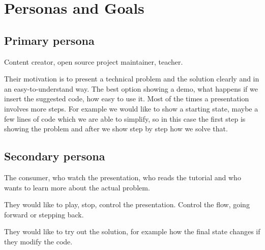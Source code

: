 \chapter{Personas and Goals}\label{C:personas}

\section{Primary persona}

Content creator, open source project maintainer, teacher.

Their motivation is to present a technical problem and the solution clearly and in an easy-to-understand way. The best option showing a demo, what happens if we insert the suggested code, how easy to use it. Most of the times a presentation involves more steps. For example we would like to show a starting state, maybe a few lines of code which we are able to simplify, so in this case the first step is showing the problem and after we show step by step how we solve that.

\section{Secondary persona}

The consumer, who watch the presentation, who reads the tutorial and who wants to learn more about the actual problem.

They would like to play, stop, control the presentation. Control the flow, going forward or stepping back.

They would like to try out the solution, for example how the final state changes if they modify the code.
